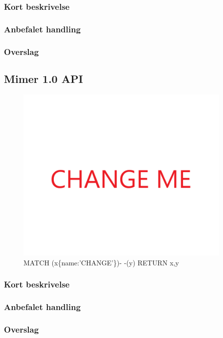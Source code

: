 \documentclass{article}
\begin{document}
\subsubsection{Kort beskrivelse}
\subsubsection{Anbefalet handling}
\subsubsection{Overslag}
\subsection{Mimer 1.0 API}
\begin{figure}[h]
\includegraphics[width=300pt]{CHANGE.PNG}
\caption{MATCH (x\{name:'CHANGE'\})- -(y) RETURN x,y}
\end{figure}
\subsubsection{Kort beskrivelse}
\subsubsection{Anbefalet handling}
\subsubsection{Overslag}
\end{document}
